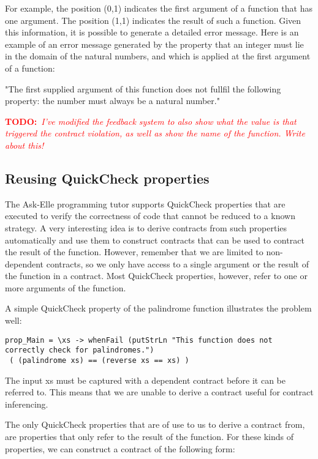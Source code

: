 \documentclass[10pt,a4paper]{article}
\newcommand{\annotate}[3]{
	\begin{scriptsize}
	\textcolor{#1}{\textbf{#2}~\textit{#3}}
	\end{scriptsize}\newline}
\newcommand{\todo}[1]{\annotate{red} {TODO:} {#1}}
\begin{document}
For example, the position (0,1) indicates the first argument of a function that has one argument.
The position (1,1) indicates the result of such a function.
Given this information, it is possible to generate a detailed error message.
Here is an example of an error message generated by the property that an integer must lie in the domain of the natural numbers, and which is applied at the first argument of a function: 

"The first supplied argument of this function does not fullfil the following property: the number must always be a natural number."

\todo{I've modified the feedback system to also show what the value is that triggered the contract violation, as well as show the name of the function. Write about this!}

\subsection{Reusing QuickCheck properties}

The Ask-Elle programming tutor supports QuickCheck properties that are executed to verify the correctness of code that cannot be reduced to a known strategy.
A very interesting idea is to derive contracts from such properties automatically and use them to construct contracts that can be used to contract the result of the function.
However, remember that we are limited to non-dependent contracts, so we only have access to a single argument or the result of the function in a contract.
Most QuickCheck properties, however, refer to one or more arguments of the function.

A simple QuickCheck property of the palindrome function illustrates the problem well:

\begin{lstlisting}
prop_Main = \xs -> whenFail (putStrLn "This function does not correctly check for palindromes.") 
 ( (palindrome xs) == (reverse xs == xs) )  
\end{lstlisting}

The input xs must be captured with a dependent contract before it can be referred to.
This means that we are unable to derive a contract useful for contract inferencing.

The only QuickCheck properties that are of use to us to derive a contract from, are properties that only refer to the result of the function.
For these kinds of properties, we can construct a contract of the following form:
\end{document}
